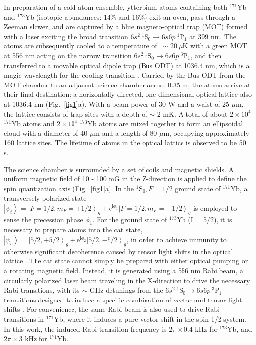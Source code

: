 \documentclass[pdflatex,sn-nature,centre]{sn-jnl}%
\begin{document}
In preparation of a cold-atom ensemble, ytterbium atoms containing both $^{171}$Yb and $^{173}$Yb (isotopic abundances: 14\% and 16\%) exit an oven, pass through a Zeeman slower, and are captured by a blue magneto-optical trap (MOT) formed with a laser exciting the broad transition ${6s^2}\ {^{1}\mathrm{S}_0}\rightarrow{6s6p\ ^{1}\mathrm{P}_1}$ at 399 nm. The atoms are subsequently cooled to a temperature of $~\sim20\ \mu$K with a green MOT at 556 nm acting on the narrow transition ${6s^2}\ {^{1}\mathrm{S}_0}\rightarrow{6s6p\ ^{3}\mathrm{P}_1}$, and then transferred to a movable optical dipole trap (Bus ODT) at 1036.4 nm, which is a magic wavelength for the cooling transition \cite{Zheng2020Magic}. Carried by the Bus ODT from the MOT chamber to an adjacent science chamber across 0.35 m, the atoms arrive at their final destination: a horizontally directed, one-dimensional optical lattice also at 1036.4 nm (Fig.~\ref{fig1}a). With a beam power of 30 W and a waist of 25 $\mu$m, the lattice consists of trap sites with a depth of $\sim$ 2 mK. A total of about $2\times10^4$ $^{171}$Yb atoms and $2\times10^4$ $^{173}$Yb atoms are mixed together to form an ellipsoidal cloud with a diameter of 40 $\mu$m and a length of 80 $\mu$m, occupying approximately 160 lattice sites. The lifetime of atoms in the optical lattice is observed to be 50 s.

The science chamber is surrounded by a set of coils and magnetic shields. A uniform magnetic field of 10 - 100 mG in the Z-direction is applied to define the spin quantization axis (Fig.~\ref{fig1}a). In the $^{1}\mathrm S_0,\mathit F=\mathrm 1/2$ ground state of $^{171}$Yb, a transversely polarized state $\left\vert\psi_{t}\right\rangle = \left\vert F=1/2,m_F=+1/2\right\rangle_g+\mathrm{e}^{\mathrm{i}\phi_1}\left\vert\mathit F=\mathrm 1/2,\mathit m_F=\mathrm-1/2\right\rangle_{\mathit g}$ is employed to sense the precession phase $\phi_{1}$. For the ground state of $^{173}$Yb  (I = 5/2), it is necessary to prepare atoms into the cat state, $\left\vert\psi_{c}\right\rangle = \left\vert5/2,+5/2\right\rangle_g+\mathrm{e}^{\mathrm{i}\phi_2}\left\vert5/2,-5/2\right\rangle_g$, in order to achieve immunity to otherwise significant decoherence caused by tensor light shifts in the optical lattice \cite{Yang2025Cat}. The cat state cannot simply be prepared with either optical pumping or a rotating magnetic field. Instead, it is generated using a 556 nm Rabi beam, a circularly polarized laser beam traveling in the X-direction to drive the necessary Rabi transitions, with its $\sim$ GHz detunings from the ${6s^2}\ {^{1}\mathrm{S}_0}\rightarrow{6s6p\ ^{3}\mathrm{P}_1}$ transitions designed to induce a specific combination of vector and tensor light shifts \cite{Yang2025Cat}. For convenience, the same Rabi beam is also used to drive Rabi transitions in $^{171}$Yb, where it induces a pure vector shift in the spin-1/2 system. In this work, the induced Rabi transition frequency is $2\pi\times0.4$ kHz for $^{173}$Yb, and $2\pi\times3$ kHz for $^{171}$Yb.
\end{document}
